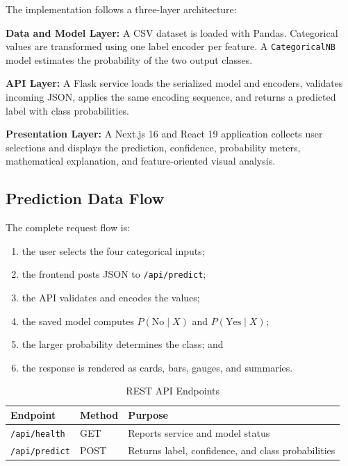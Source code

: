 \documentclass[conference]{IEEEtran}
\begin{document}
The implementation follows a three-layer architecture:

\textbf{Data and Model Layer:} A CSV dataset is loaded with Pandas. Categorical values are transformed using one label encoder per feature. A \texttt{CategoricalNB} model estimates the probability of the two output classes.

\textbf{API Layer:} A Flask service loads the serialized model and encoders, validates incoming JSON, applies the same encoding sequence, and returns a predicted label with class probabilities.

\textbf{Presentation Layer:} A Next.js 16 and React 19 application collects user selections and displays the prediction, confidence, probability meters, mathematical explanation, and feature-oriented visual analysis.

\subsection{Prediction Data Flow}

The complete request flow is:
\begin{enumerate}
    \item the user selects the four categorical inputs;
    \item the frontend posts JSON to \texttt{/api/predict};
    \item the API validates and encodes the values;
    \item the saved model computes $P(\text{No}\mid X)$ and $P(\text{Yes}\mid X)$;
    \item the larger probability determines the class; and
    \item the response is rendered as cards, bars, gauges, and summaries.
\end{enumerate}

\begin{table}[t]
\centering
\caption{REST API Endpoints}
\label{tab:api}
\footnotesize
\begin{tabular}{p{} p{} p{}}
\toprule
\textbf{Endpoint} & \textbf{Method} & \textbf{Purpose}\\
\midrule
\texttt{/api/health} & GET & Reports service and model status\\
\texttt{/api/predict} & POST & Returns label, confidence, and class probabilities\\
\bottomrule
\end{tabular}
\end{table}
\end{document}
